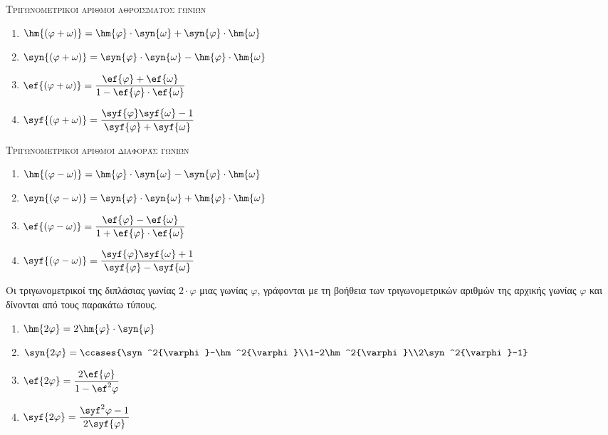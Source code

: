 \documentclass[twoside,nofonts,internet,shmeiwseis]{thewria}
\begin{document}
\begin{center}
{\large \scfont\scshape{\textcolor{\xrwma}{Τριγωνομετρικοί αριθμοί αθροίσματος γωνιών}}}
\end{center}
\begin{multicols}{2}
\begin{enumerate}[itemsep=0mm]
\item $ \hm{\left( \varphi+\omega\right) }=\hm{\varphi}\cdot\syn{\omega}+\syn{\varphi}\cdot\hm{\omega} $
\item $ \syn {\left( \varphi+\omega\right) }=\syn{\varphi}\cdot\syn{\omega}-\hm{\varphi}\cdot\hm{\omega} $
\item $ \ef{\left( \varphi+\omega\right) }=\dfrac{\ef{\varphi}+\ef{\omega}}{1-\ef{\varphi}\cdot\ef{\omega}} $
\item $ \syf{\left( \varphi+\omega\right) }=\dfrac{\syf{\varphi}\syf{\omega}-1}{\syf{\varphi}+\syf{\omega}} $
\end{enumerate}
\end{multicols}
\begin{center}
{\large \scfont\scshape{\textcolor{\xrwma}{Τριγωνομετρικοί αριθμοί διαφοράς γωνιών}}}
\end{center}
\begin{multicols}{2}
\begin{enumerate}[itemsep=0mm]
\item $ \hm{\left( \varphi-\omega\right) }=\hm{\varphi}\cdot\syn{\omega}-\syn{\varphi}\cdot\hm{\omega} $
\item $ \syn{\left( \varphi-\omega\right) }=\syn{\varphi}\cdot\syn{\omega}+\hm{\varphi}\cdot\hm{\omega} $
\item $ \ef{\left( \varphi-\omega\right) }=\dfrac{\ef{\varphi}-\ef{\omega}}{1+\ef{\varphi}\cdot\ef{\omega}} $
\item $ \syf{\left( \varphi-\omega\right) }=\dfrac{\syf{\varphi}\syf{\omega}+1}{\syf{\varphi}-\syf{\omega}} $
\end{enumerate}
\end{multicols}
Οι τριγωνομετρικοί της διπλάσιας γωνίας $ 2\cdot\varphi $ μιας γωνίας $ \varphi $, γράφονται με τη βοήθεια των τριγωνομετρικών αριθμών της αρχικής γωνίας $ \varphi $ και δίνονται από τους παρακάτω τύπους.
\begin{center}
\begin{multicols}{2}
\begin{enumerate}[itemsep=0mm]
\item $ \hm{2\varphi}=2\hm{\varphi}\cdot\syn{\varphi} $
\item $ \syn{2\varphi}=\ccases{\syn^2{\varphi}-\hm^2{\varphi}\\1-2\hm^2{\varphi}\\2\syn^2{\varphi}-1} $
\item $ \ef{2\varphi}=\dfrac{2\ef{\varphi}}{1-\ef^2{\varphi}}$
\item $ \syf{2\varphi}=\dfrac{\syf^2{\varphi}-1}{2\syf{\varphi}} $
\end{enumerate}
\end{multicols}
\end{center}
\end{document}
